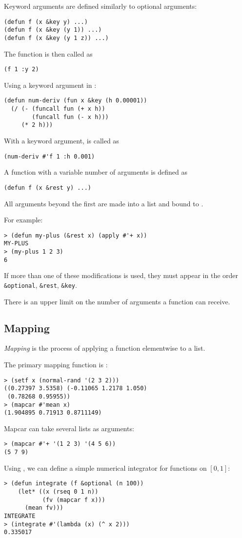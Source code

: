 \begin{slide}{}
Keyword arguments are defined similarly to optional arguments:
{\Large
\begin{verbatim}
(defun f (x &key y) ...)
(defun f (x &key (y 1)) ...)
(defun f (x &key (y 1 z)) ...)
\end{verbatim}}
The function is then called as
{\Large
\begin{verbatim}
(f 1 :y 2)
\end{verbatim}}
Using a keyword argument in :
{\Large
\begin{verbatim}
(defun num-deriv (fun x &key (h 0.00001))
  (/ (- (funcall fun (+ x h))
        (funcall fun (- x h)))
     (* 2 h)))
\end{verbatim}}
With a keyword argument,  is called as
{\Large
\begin{verbatim}
(num-deriv #'f 1 :h 0.001)
\end{verbatim}}
\end{slide}

\begin{slide}{}
A function with a variable number of arguments is defined as
{\Large
\begin{verbatim}
(defun f (x &rest y) ...)
\end{verbatim}}
All arguments beyond the first are made into a list and bound to
.

For example:
{\Large
\begin{verbatim}
> (defun my-plus (&rest x) (apply #'+ x))
MY-PLUS
> (my-plus 1 2 3)
6
\end{verbatim}}
If more than one of these modifications is used, they must appear in
the order \verb+&optional+, \verb+&rest+, \verb+&key+.

There is an upper limit on the number of arguments a function can receive.
\end{slide}

\begin{slide}{}
\section{Mapping}
{\em Mapping}\/ is the process of applying a function elementwise to a
list.

The primary mapping function is :
{\Large
\begin{verbatim}
> (setf x (normal-rand '(2 3 2)))
((0.27397 3.5358) (-0.11065 1.2178 1.050) 
 (0.78268 0.95955))
> (mapcar #'mean x)
(1.904895 0.71913 0.8711149)
\end{verbatim}}
Mapcar can take several lists as arguments:
{\Large
\begin{verbatim}
> (mapcar #'+ '(1 2 3) '(4 5 6))
(5 7 9)
\end{verbatim}}
Using , we can define a simple numerical integrator
for functions on $[0,1]$:
{\Large
\begin{verbatim}
> (defun integrate (f &optional (n 100))
    (let* ((x (rseq 0 1 n))
           (fv (mapcar f x)))
      (mean fv)))
INTEGRATE
> (integrate #'(lambda (x) (^ x 2)))
0.335017
\end{verbatim}}
\end{slide}

